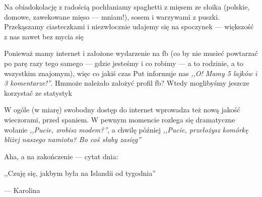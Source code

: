 

Na obiadokolację z radością pochłaniamy spaghetti z mięsem ze słoika (polskie, domowe, zawekowane mięso --- mniam!), sosem i warzywami z puszki. Przekąszamy ciasteczkami i niezwłocznie udajemy się na spoczynek --- większość z nas nawet bez mycia się\textellipsis


Ponieważ mamy internet i założone wydarzenie na fb (co by nie musieć powtarzać po parę razy tego samego --- gdzie jesteśmy i co robimy --- a to rodzinie, a to wszystkim znajomym), więc co jakiś czas Put informuje nas \emph{,,O! Mamy 5 lajków i 3 komentarze!''}. Hm\textellipsis może należało założyć profil fb? Wtedy moglibyśmy jeszcze korzystać ze statystyk\textellipsis

W ogóle (w miarę) swobodny dostęp do internet wprowadza też nową jakość wieczorami, przed spaniem. W pewnym momencie rozlega się dramatyczne wołanie \emph{,,Pucie, zrobisz modem?''}, a chwilę później \emph{,,Pucie, przełożysz komórkę bliżej naszego namiotu? Bo coś słaby zasięg\textellipsis''}

\vspace{16pt}

Aha, a na zakończenie --- cytat dnia:
\epigraph{,,Czuję się, jakbym była na Islandii od tygodnia\textellipsis''}{--- \textup{Karolina}}

